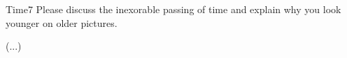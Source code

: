 \begin{question}{Time}{7}
Please discuss the inexorable passing of time and explain why you look younger on older pictures.
\end{question}
\begin{answer}
(...)
\end{answer}